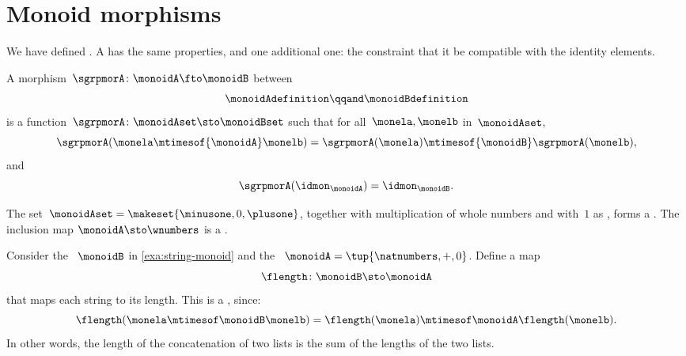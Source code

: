 
\section{Monoid morphisms}
We have defined .
A  has the same properties, and one additional one: the constraint that it be compatible with the identity elements.

\begin{ctdefinition}
    \label{def:monoid-mor}
    A morphism~$\sgrpmorA\colon \monoidA \fto \monoidB$ between 
    \begin{equation}
        \monoidAdefinition
        \qqand
        \monoidBdefinition
    \end{equation}
    is a function~$\sgrpmorA \colon \monoidAset \sto \monoidBset$ such that for all~$\monela, \monelb$ in~$\monoidAset$,
    \begin{equation}
        \label{eq:mon-mor-comp}
        \sgrpmorA (\monela \mtimesof{\monoidA} \monelb) = \sgrpmorA (\monela) \mtimesof{\monoidB} \sgrpmorA(\monelb),
    \end{equation}
    and
    \begin{equation}
        \label{eq:mon-id-comp}
        \sgrpmorA (\idmon_\monoidA) = \idmon_{\monoidB}.
    \end{equation}
\end{ctdefinition}

\begin{example}
    The set~$\monoidAset = \makeset{ \minusone, 0, \plusone }$, together with multiplication of whole numbers and with~$1$ as , forms a .
    The inclusion map $\monoidA \sto \wnumbers$ is a .
\end{example}

\begin{example}
    \label{exa:string-length}
    Consider the ~$\monoidB$ in \cref{exa:string-monoid} and the ~$\monoidA=\tup{\natnumbers, +, 0}$.
    Define a map
    \begin{equation}
        \flength \colon \monoidB \sto \monoidA
    \end{equation}
    that maps each string to its length.
    This is a , since:
    \begin{equation}
        \flength(\monela \mtimesof\monoidB \monelb)=\flength(\monela)\mtimesof\monoidA \flength(\monelb).
    \end{equation}
    In other words, the length of the concatenation of two lists is the sum of the lengths of the two lists.
\end{example}

